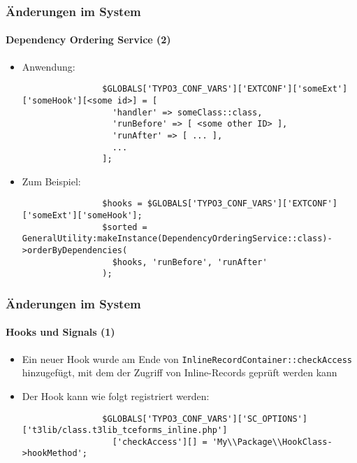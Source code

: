 \begin{frame}[fragile]
	\frametitle{Änderungen im System}
	\framesubtitle{Dependency Ordering Service (2)}

	\lstset{basicstyle=\tiny\ttfamily}

	\begin{itemize}

		\item Anwendung:

			\begin{lstlisting}
				$GLOBALS['TYPO3_CONF_VARS']['EXTCONF']['someExt']['someHook'][<some id>] = [
				  'handler' => someClass::class,
				  'runBefore' => [ <some other ID> ],
				  'runAfter' => [ ... ],
				  ...
				];
			\end{lstlisting}

		\item Zum Beispiel:

			\begin{lstlisting}
				$hooks = $GLOBALS['TYPO3_CONF_VARS']['EXTCONF']['someExt']['someHook'];
				$sorted = GeneralUtility:makeInstance(DependencyOrderingService::class)->orderByDependencies(
				  $hooks, 'runBefore', 'runAfter'
				);
			\end{lstlisting}

	\end{itemize}

\end{frame}


\begin{frame}[fragile]
	\frametitle{Änderungen im System}
	\framesubtitle{Hooks und Signals (1)}

	\lstset{basicstyle=\tiny\ttfamily}

	\begin{itemize}

		\item Ein neuer Hook wurde am Ende von \texttt{InlineRecordContainer::checkAccess} hinzugefügt,
			mit dem der Zugriff von Inline-Records geprüft werden kann

		\item Der Hook kann wie folgt registriert werden:

			\begin{lstlisting}
				$GLOBALS['TYPO3_CONF_VARS']['SC_OPTIONS']['t3lib/class.t3lib_tceforms_inline.php']
				  ['checkAccess'][] = 'My\\Package\\HookClass->hookMethod';
			\end{lstlisting}

	\end{itemize}

\end{frame}

